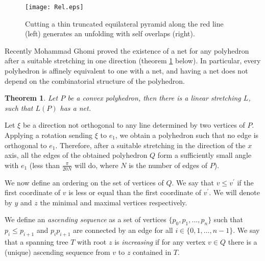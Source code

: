 \documentclass[openright, 12pt]{article}
\newtheorem{teorema}{Theorem}
\begin{document}
\begin{figure}[h]
\centering
\texttt{[image: Rel.eps]}
\caption{Cutting a thin truncated equilateral pyramid along the red line (left) generates an unfolding with self overlaps (right).}\label{Tet}
\end{figure}















Recently Mohammad Ghomi \cite{Gh} proved the existence of a net for any polyhedron after a suitable stretching in one direction (theorem \ref{Str} below). In particular, every polyhedron is affinely equivalent to one with a net, and having a net does not depend on the combinatorial structure of the polyhedron. 


\begin{teorema}\label{Str}
{\rm Let $P$ be a convex polyhedron, then there is a linear stretching $L$, such that $L(P)$ has a net.}
\end{teorema}


Let $\xi $ be a direction not orthogonal to any line determined by two vertices of $P$. Applying a rotation sending $\xi $ to $e_1 $, we obtain a polyhedron such that no edge is orthogonal to $e_1$. Therefore, after a suitable stretching in the direction of the $x$ axis, all the edges of the obtained polyhedron $Q$  form a sufficiently small angle with $e_1$ (less than $\frac{\pi}{20 N}$ will do, where $N$ is the number of edges of $P$).


We now define an ordering on the set of vertices of $Q$. We say that $v \leq v^{\prime}$ if the first coordinate of $v$ is less or equal than the first coordinate of $v^{\prime}$. We will denote by $y$ and $z$ the minimal and maximal vertices respectively.

We define an \textit{ascending sequence} as a set of vertices $\{ p_0, p_1, \ldots , p_n   \}$ such that $p_i \leq p_{i+1}$ and $p_i p_{i+1}$ are connected by an edge for all $i \in \{ 0,1, \ldots, n-1 \} $. We say that a spanning tree $T$ with root $z$ is \textit{increasing} if for any vertex $v\in Q$ there is a (unique) ascending sequence from $v$ to $z$ contained in $T$. 
\end{document}
